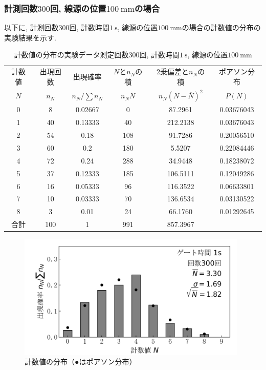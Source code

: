 \documentclass{jarticle}
\begin{document}
\subsubsection{計測回数$300$回, 線源の位置$100\ \mathrm{mm}$の場合}

以下に, 計測回数$300$回, 計数時間$1\ \mathrm{s}$, 線源の位置$100\ \mathrm{mm}$の場合の計数値の分布の実験結果を示す.

\begin{table}[H]
  \caption{計数値の分布の実験データ\protect\linebreak 測定回数$300$回, 計数時間$1\ \mathrm{s}$, 線源の位置$100\ \mathrm{mm}$}
  \label{tb:count-distribution-100mm-300times}
  \hspace{-1cm}
  \begin{tabular}{cccccc}
    \hline
    計数値 & 出現回数 & 出現確率 & $N$と$n_N$の積 & 2乗偏差と$n_N$の積 & ポアソン分布 \\
    $N$ & $n_N$ & $n_N/\sum n_N$ & $n_N N$ & $n_N(N-\overline{N})^2$ & $P(N)$ \\
    \hline
    0 & 8 & 0.02667 & 0 & 87.2961 & 0.03676043 \\
    1 & 40 & 0.13333 & 40 & 212.2138 & 0.03676043 \\
    2 & 54 & 0.18 & 108 & 91.7286 & 0.20056510 \\
    3 & 60 & 0.2 & 180 & 5.5207 & 0.22084446 \\
    4 & 72 & 0.24 & 288 & 34.9448 & 0.18238072 \\
    5 & 37 & 0.12333 & 185 & 106.5111 & 0.12049286 \\
    6 & 16 & 0.05333 & 96 & 116.3522 & 0.06633801 \\
    7 & 10 & 0.03333 & 70 & 136.6534 & 0.03130522 \\
    8 & 3 & 0.01 & 24 & 66.1760 & 0.01292645 \\
    \hline
    合計 & 100 & 1 & 991 & 857.3967 & \\
    \hline
  \end{tabular}
\end{table}

\begin{figure}[H]
  \begin{center}
    \includegraphics[width=110mm]{graph/count-distribution-100mm-300times.png}
    \caption{計数値の分布（●はポアソン分布）}
    \label{fg:count-distribution-100mm-300times}
  \end{center}
\end{figure}
\end{document}
